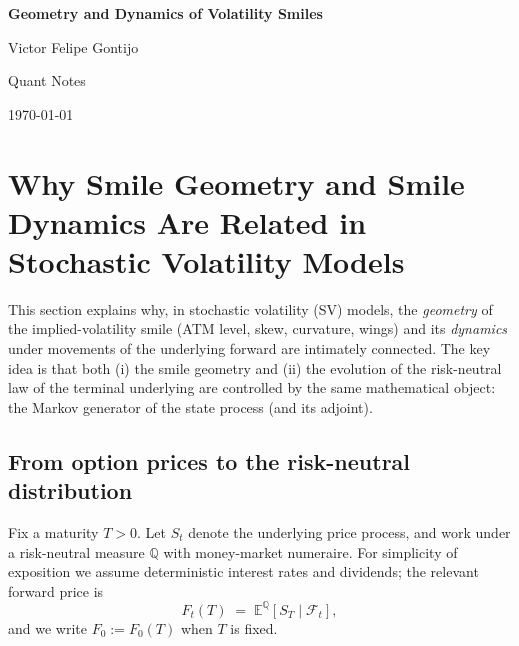 \documentclass[11pt,a4paper]{report}
\begin{document}
\begin{titlepage}
  \centering
  \vspace*{2cm}
  {\Large \textbf{Geometry and Dynamics of Volatility Smiles}\par}
  \vspace{1.5cm}
  {\large Victor Felipe Gontijo \par}
  \vspace{0.5cm}
  {\large Quant Notes \par}
  \vspace{0.5cm}
  \vfill
  {\large \today\par}
\end{titlepage}



\tableofcontents
\clearpage



\section{Why Smile Geometry and Smile Dynamics Are Related in Stochastic Volatility Models}
\label{sec:geometry_dynamics_link}

This section explains why, in stochastic volatility (SV) models, the \emph{geometry} of the implied-volatility smile (ATM level, skew, curvature, wings) and its \emph{dynamics} under movements of the underlying forward are intimately connected.
The key idea is that both (i) the smile geometry and (ii) the evolution of the risk-neutral law of the terminal underlying are controlled by the same mathematical object: the Markov generator of the state process (and its adjoint).

\subsection{From option prices to the risk-neutral distribution}
Fix a maturity $T>0$. Let $S_t$ denote the underlying price process, and work under a risk-neutral measure $\mathbb{Q}$ with money-market numeraire.
For simplicity of exposition we assume deterministic interest rates and dividends; the relevant forward price is
\begin{equation}
F_t(T) \;=\; \mathbb{E}^{\mathbb{Q}}\!\left[S_T \mid \mathcal{F}_t\right],
\end{equation}
and we write $F_0:=F_0(T)$ when $T$ is fixed.
\end{document}
